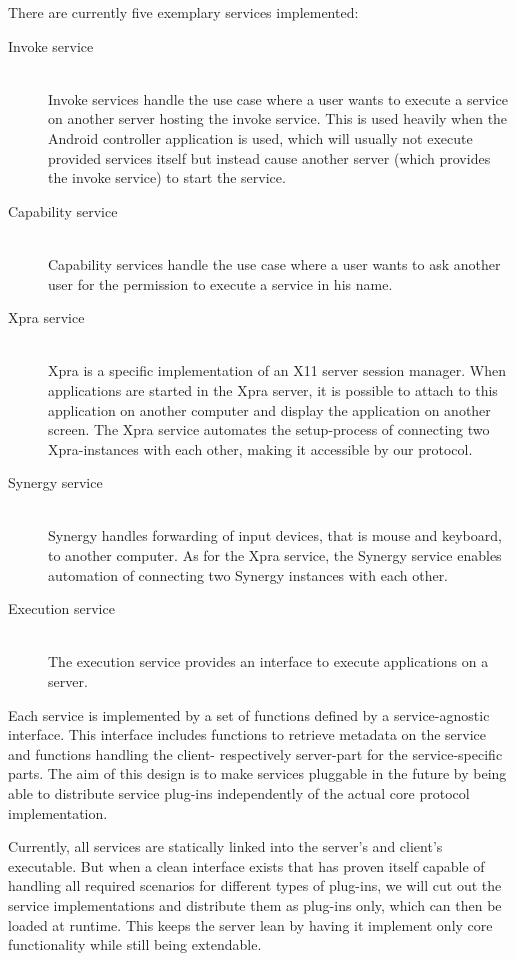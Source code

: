 There are currently five exemplary services implemented:
\begin{description}
    \item[Invoke service]\hfill\\
        Invoke services handle the use case where a user wants to execute a service on another server hosting the invoke service.
        This is used heavily when the Android controller application is used, which will usually not execute provided services itself but instead cause another server (which provides the invoke service) to start the service.
    \item[Capability service]\hfill\\
        Capability services handle the use case where a user wants to ask another user for the permission to execute a service in his name.
    \item[Xpra service]\hfill\\
        Xpra is a specific implementation of an X11 server session manager.
        When applications are started in the Xpra server, it is possible to attach to this application on another computer and display the application on another screen.
        The Xpra service automates the setup-process of connecting two Xpra-instances with each other, making it accessible by our protocol.
    \item[Synergy service]\hfill\\
        Synergy handles forwarding of input devices, that is mouse and keyboard, to another computer.
        As for the Xpra service, the Synergy service enables automation of connecting two Synergy instances with each other.
    \item[Execution service]\hfill\\
        The execution service provides an interface to execute applications on a server.
\end{description}

Each service is implemented by a set of functions defined by a service-agnostic interface.
This interface includes functions to retrieve metadata on the service and functions handling the client- respectively server-part for the service-specific parts.
The aim of this design is to make services pluggable in the future by being able to distribute service plug-ins independently of the actual core protocol implementation.

Currently, all services are statically linked into the server's and client's executable.
But when a clean interface exists that has proven itself capable of handling all required scenarios for different types of plug-ins, we will cut out the service implementations and distribute them as plug-ins only, which can then be loaded at runtime.
This keeps the server lean by having it implement only core functionality while still being extendable.

